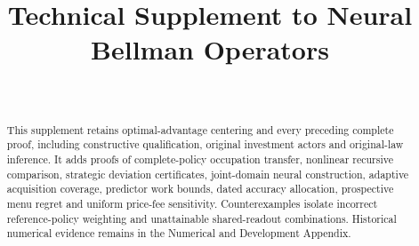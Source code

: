 \documentclass[ecta,nameyear,draft]{econsocart}
\begin{document}
\begin{frontmatter}
\title{Technical Supplement to Neural Bellman Operators}
\begin{aug}
\author[id=au1,addressref={add1}]{~}
\address[id=add1]{Peking University}
\end{aug}
\begin{abstract}
This supplement retains optimal-advantage centering and every preceding complete proof, including constructive qualification, original investment actors and original-law inference. It adds proofs of complete-policy occupation transfer, nonlinear recursive comparison, strategic deviation certificates, joint-domain neural construction, adaptive acquisition coverage, predictor work bounds, dated accuracy allocation, prospective menu regret and uniform price-fee sensitivity. Counterexamples isolate incorrect reference-policy weighting and unattainable shared-readout combinations. Historical numerical evidence remains in the Numerical and Development Appendix.
\end{abstract}
\end{frontmatter}









\end{document}

